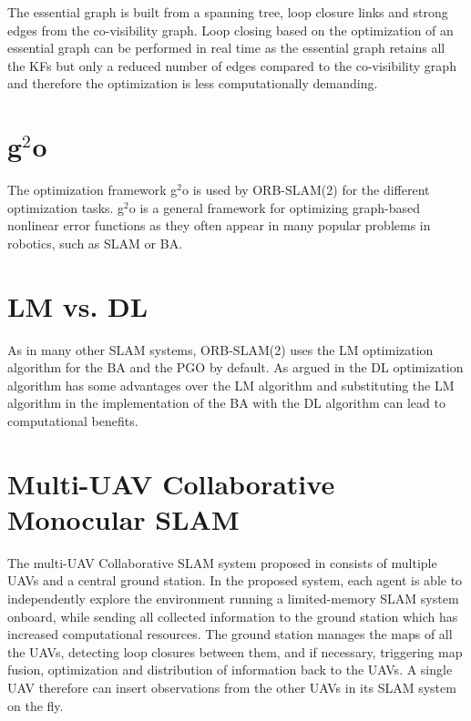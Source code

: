 The essential graph is built from a spanning tree, loop closure links and strong edges from the co-visibility graph. Loop closing based on the optimization of an essential graph can be performed in real time as the essential graph retains all the \acp{KF} but only a reduced number of edges compared to the co-visibility graph and therefore the optimization is less computationally demanding.

\section{g$^2$o}
The optimization framework g$^2$o \cite{Kummerle2011} is used by ORB-SLAM(2) for the different optimization tasks. g$^2$o is a general framework for optimizing graph-based nonlinear error functions as they often appear in many popular problems in robotics, such as \ac{SLAM} or \acf{BA}. 

\section{\acl{LM} vs. \acl{DL}}
As in many other \ac{SLAM} systems, ORB-SLAM(2) uses the \acf{LM} optimization algorithm for the \ac{BA} and the \acf{PGO} by default. As argued in \cite{Lourakis2005} the \acf{DL} optimization algorithm has some advantages over the \ac{LM} algorithm and substituting the \ac{LM} algorithm in the implementation of the \ac{BA} with the \ac{DL} algorithm can lead to computational benefits.

\section{Multi-UAV Collaborative Monocular SLAM}
The multi-\ac{UAV} Collaborative \ac{SLAM} system proposed in \cite{Schmuck2017} consists of multiple \acp{UAV} and a central ground station. In the proposed system, each agent is able to independently explore the environment running a limited-memory \ac{SLAM} system onboard, while sending all collected information to the ground station which has increased computational resources. The ground station manages the maps of all the \acp{UAV}, detecting loop closures between them, and if necessary, triggering map fusion, optimization and distribution of information back to the \acp{UAV}. A single \ac{UAV} therefore can insert observations from the other \acp{UAV} in its \ac{SLAM} system on the fly.
